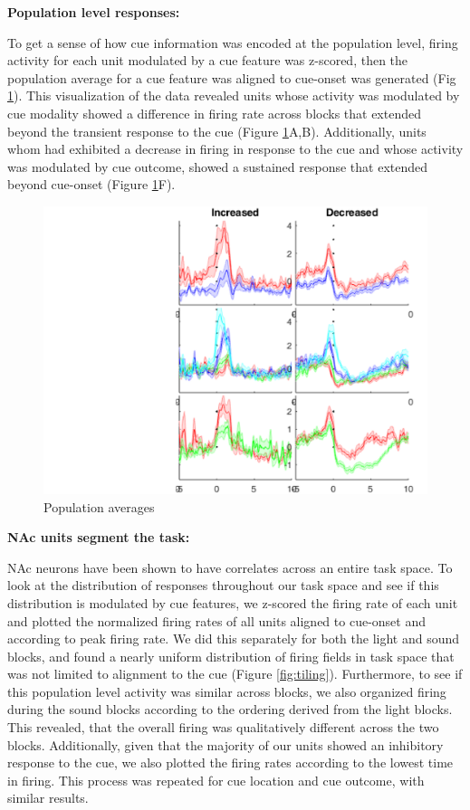 \documentclass[11pt]{article}
\begin{document}
{\bf Population level responses:}

To get a sense of how cue information was encoded at the population level, firing activity for each unit modulated by a cue feature was z-scored, then the population average for a cue feature was aligned to cue-onset was generated (Fig \ref{fig:pop}). This visualization of the data revealed units whose activity was modulated by cue modality showed a difference in firing rate across blocks that extended beyond the transient response to the cue (Figure \ref{fig:pop}A,B). Additionally, units whom had exhibited a decrease in firing in response to the cue and whose activity was modulated by cue outcome, showed a sustained response that extended beyond cue-onset (Figure \ref{fig:pop}F).  

\begin{figure}[h]
\centering
\includegraphics[width=\textwidth]{Fig 7 - Population averages.png}
\caption{Population averages}
\label{fig:pop}
\end{figure}

{\bf NAc units segment the task:}

NAc neurons have been shown to have correlates across an entire task space. To look at the distribution of responses throughout our task space and see if this distribution is modulated by cue features, we z-scored the firing rate of each unit and plotted the normalized firing rates of all units aligned to cue-onset and according to peak firing rate. We did this separately for both the light and sound blocks, and found a nearly uniform distribution of firing fields in task space that was not limited to alignment to the cue (Figure \ref{fig:tiling}). Furthermore, to see if this population level activity was similar across blocks, we also organized firing during the sound blocks according to the ordering derived from the light blocks. This revealed, that the overall firing was qualitatively different across the two blocks. Additionally, given that the majority of our units showed an inhibitory response to the cue, we also plotted the firing rates according to the lowest time in firing. This process was repeated for cue location and cue outcome, with similar results. 
\end{document}
